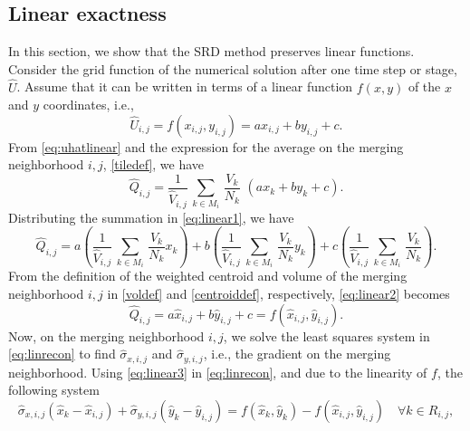 \subsection{Linear exactness}
In this section, we show that the SRD method preserves linear functions.  Consider the grid function of the numerical solution after one time step or stage, $\widehat{U}$.  Assume that it can be written in terms of a linear function $f(x,y)$ of the $x$ and $y$ coordinates, i.e.,
\begin{equation}
    \label{eq:uhatlinear}
\widehat{U}_{i,j} = f(x_{i,j},y_{i,j}) = ax_{i,j} + by_{i,j} + c.
\end{equation}
From \eqref{eq:uhatlinear} and the expression for the average on the merging neighborhood $i,j$, \eqref{tiledef}, we have
\begin{equation}
    \label{eq:linear1}
\widehat{Q}_{i,j} = \frac{1}{{\widehat V}_{i,j}} \, \sum_{k \in M_i} \,  
\frac{V_k}{N_k}  \,\, (ax_{k} + by_{k} + c).
\end{equation}
Distributing the summation in \eqref{eq:linear1}, we have
\begin{equation}\label{eq:linear2}
\widehat{Q}_{i,j} =  a \left(\frac{1}{{\widehat V}_{i,j}} \, \sum_{k \in M_i} \,  
\frac{V_k}{N_k} x_{k} \right) + b\left(\frac{1}{{\widehat V}_{i,j}} \, \sum_{k \in M_i} \,  
\frac{V_k}{N_k} y_{k} \right) + c\left(\frac{1}{{\widehat V}_{i,j}} \, \sum_{k \in M_i} \,
\frac{V_k}{N_k}\right) .
\end{equation}
From the definition of the weighted centroid and volume of the merging neighborhood $i,j$ in \eqref{voldef} and \eqref{centroiddef}, respectively, \eqref{eq:linear2} becomes
\begin{equation}\label{eq:linear3}
\widehat{Q}_{i,j} =  a \widehat{x}_{i,j} + b\widehat{y}_{i,j} + c = f(\widehat{x}_{i,j},\widehat{y}_{i,j}).
\end{equation}
Now, on the merging neighborhood $i,j$, we solve the least squares system in \eqref{eq:linrecon} to find $\widehat{\sigma}_{x,i,j}$ and $\widehat{\sigma}_{y,i,j}$, i.e., the gradient on the merging neighborhood.  Using \eqref{eq:linear3} in \eqref{eq:linrecon}, and due to the linearity of $f$, the following system
\begin{equation}
\widehat{\sigma}_{x,i,j}(\widehat{x}_{k} - \widehat{x}_{i,j}) + \widehat{\sigma}_{y,i,j}(\widehat{y}_{k} - \widehat{y}_{i,j})= f(\widehat{x}_k, \widehat{y}_k) - f(\widehat{x}_{i,j}, \widehat{y}_{i,j}) \quad \forall k \in R_{i,j},
\end{equation}
